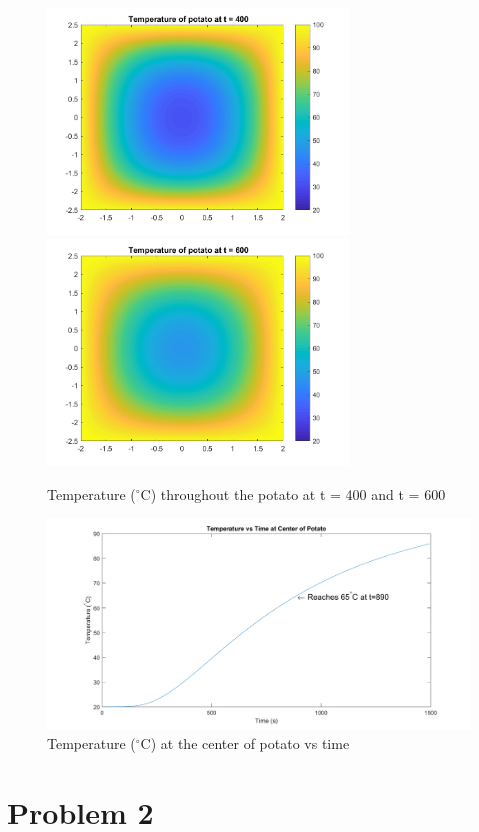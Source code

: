\documentclass[12pt]{article}
\begin{document}
\begin{figure}[htb]%
    \centering
    {\includegraphics[width=8cm]{Problem1_fig3.png}}%
    \qquad
    {\includegraphics[width=8cm]{Problem1_fig4.png}}%
    \label{fig:p1_fig3-4}%
    \caption*{Temperature ($^{\circ}$C) throughout the potato at t = 400 and t = 600}
\end{figure}
\newpage
\vfill
\begin{figure}[]
\centering
\includegraphics[width=1\textwidth]{Problem1_fig5.png}
\caption*{Temperature ($^{\circ}$C) at the center of potato vs time}
\label{fig::p1_fig5}
\end{figure}
\vfill
\clearpage

\section*{Problem 2}\label{sec::Problem2}
\end{document}
